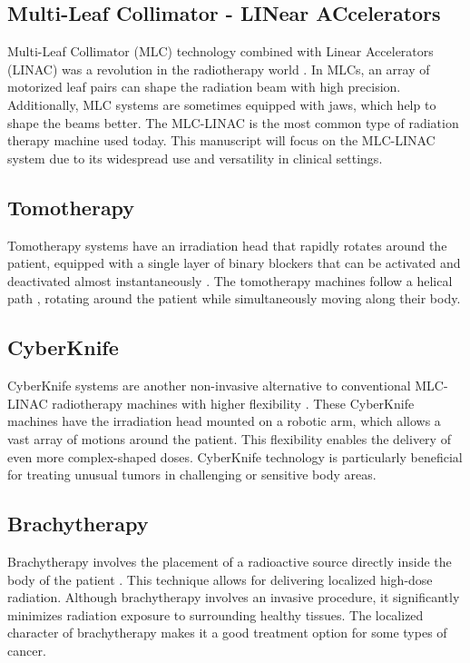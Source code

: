 \subsection[MLC-LINAC]{Multi-Leaf Collimator - LINear ACcelerators}
Multi-Leaf Collimator (MLC) technology combined with Linear Accelerators (LINAC) was a revolution in the radiotherapy world \cite{Bakiu2013} \cite{Xu2017}.
In MLCs, an array of motorized leaf pairs can shape the radiation beam with high precision.
Additionally, MLC systems are sometimes equipped with jaws, which help to shape the beams better.
The MLC-LINAC is the most common type of radiation therapy machine used today.
This manuscript will focus on the MLC-LINAC system due to its widespread use and versatility in clinical settings.

\subsection{Tomotherapy}
Tomotherapy systems have an irradiation head that rapidly rotates around the patient, equipped with a single layer of binary blockers that can be activated and deactivated almost instantaneously \cite{Mackie1999}.
The tomotherapy machines follow a helical path \cite{Jeraj2004}, rotating around the patient while simultaneously moving along their body.

\subsection{CyberKnife}
CyberKnife systems are another non-invasive alternative to conventional MLC-LINAC radiotherapy machines with higher flexibility \cite{Kilby2020}.
These CyberKnife machines have the irradiation head mounted on a robotic arm, which allows a vast array of motions around the patient.
This flexibility enables the delivery of even more complex-shaped doses.
CyberKnife technology is particularly beneficial for treating unusual tumors in challenging or sensitive body areas.

\subsection{Brachytherapy}
Brachytherapy involves the placement of a radioactive source directly inside the body of the patient \cite{Chargari2019}.
This technique allows for delivering localized high-dose radiation.
Although brachytherapy involves an invasive procedure, it significantly minimizes radiation exposure to surrounding healthy tissues.
The localized character of brachytherapy makes it a good treatment option for some types of cancer.



